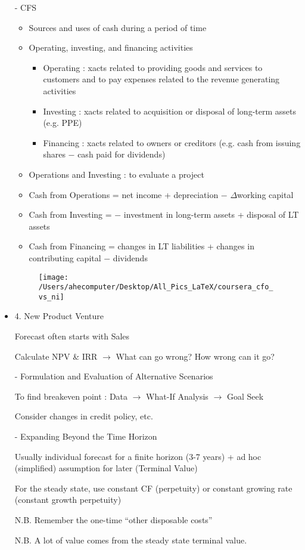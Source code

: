 \documentclass{article}
\begin{document}
\begin{itemize}
- CFS
\begin{itemize}
	\item Sources and uses of cash during a period of time
	\item Operating, investing, and financing activities
	\begin{itemize}
		\item Operating : xacts related to providing goods and services to customers and to pay expenses related to the revenue generating activities
		\item Investing : xacts related to acquisition or disposal of long-term assets (e.g. PPE)
		\item Financing : xacts related to owners or creditors (e.g. cash from issuing shares $-$ cash paid for dividends)
	\end{itemize}
	\item Operations and Investing : to evaluate a project
	\item Cash from Operations = net income + depreciation $-$ $\Delta$working capital
	\item Cash from Investing = $-$ investment in long-term assets + disposal of LT assets
	\item Cash from Financing = changes in LT liabilities + changes in contributing capital $-$ dividends
\end{itemize}
	\begin{figure}[h!]
		  \texttt{[image: /Users/ahecomputer/Desktop/All\_Pics\_LaTeX/coursera\_cfo\_vs\_ni]}
	\end{figure}

	\item 4. New Product Venture

	Forecast often starts with Sales

	Calculate NPV \& IRR $\rightarrow$ What can go wrong? How wrong can it go?

	- Formulation and Evaluation of Alternative Scenarios

	To find breakeven point : Data $\rightarrow$ What-If Analysis $\rightarrow$ Goal Seek

	Consider changes in credit policy, etc.

	- Expanding Beyond the Time Horizon

	Usually individual forecast for a finite horizon (3-7 years) +  ad hoc (simplified) assumption for later (Terminal Value)

	For the steady state, use constant CF (perpetuity) or constant growing rate (constant growth perpetuity)

	N.B. Remember the one-time ``other disposable costs''

	N.B. A lot of value comes from the steady state terminal value.
\end{itemize}
\end{document}
